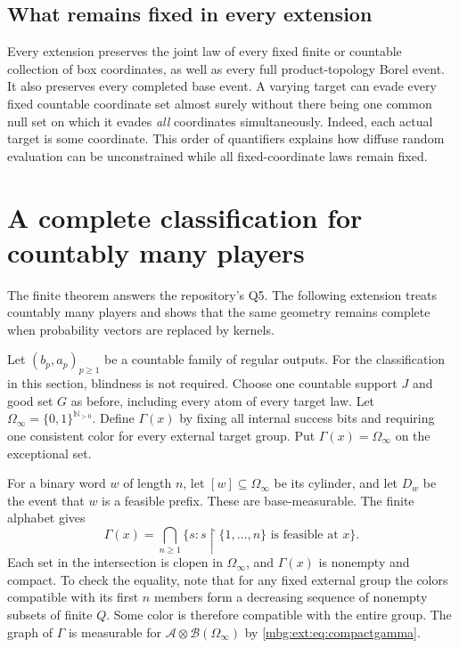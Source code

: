 \documentclass[11pt,letterpaper]{article}
\theoremstyle{definition}
\newcommand{\N}{\mathbb N}
\newcommand{\restr}{\mathbin{\upharpoonright}}
\newcommand{\A}{\mathcal A}
\newcommand{\B}{\mathcal B}
\begin{document}
\subsection{What remains fixed in every extension}

Every extension preserves the joint law of every fixed finite or countable collection of box coordinates, as well as every full product-topology Borel event. It also preserves every completed base event. A varying target can evade every fixed countable coordinate set almost surely without there being one common null set on which it evades \emph{all} coordinates simultaneously. Indeed, each actual target is some coordinate. This order of quantifiers explains how diffuse random evaluation can be unconstrained while all fixed-coordinate laws remain fixed.

\section{A complete classification for countably many players}
\label{mbg:ext:sec:countable}

The finite theorem answers the repository's Q5. The following extension treats countably many players and shows that the same geometry remains complete when probability vectors are replaced by kernels.

Let $(b_p,a_p)_{p\ge1}$ be a countable family of regular outputs. For the classification in this section, blindness is not required. Choose one countable support $J$ and good set $G$ as before, including every atom of every target law. Let $\Omega_\infty=\{0,1\}^{\N_{>0}}$. Define $\Gamma(x)$ by fixing all internal success bits and requiring one consistent color for every external target group. Put $\Gamma(x)=\Omega_\infty$ on the exceptional set.

For a binary word $w$ of length $n$, let $[w]\subseteq\Omega_\infty$ be its cylinder, and let $D_w$ be the event that $w$ is a feasible prefix. These are base-measurable. The finite alphabet gives
\begin{equation}
\Gamma(x)=\bigcap_{n\ge1}
\{s:s\restr\{1,\ldots,n\}\text{ is feasible at }x\}.
\label{mbg:ext:eq:compactgamma}
\end{equation}
Each set in the intersection is clopen in $\Omega_\infty$, and $\Gamma(x)$ is nonempty and compact. To check the equality, note that for any fixed external group the colors compatible with its first $n$ members form a decreasing sequence of nonempty subsets of finite $Q$. Some color is therefore compatible with the entire group. The graph of $\Gamma$ is measurable for $\A\otimes\B(\Omega_\infty)$ by \eqref{mbg:ext:eq:compactgamma}.
\end{document}
